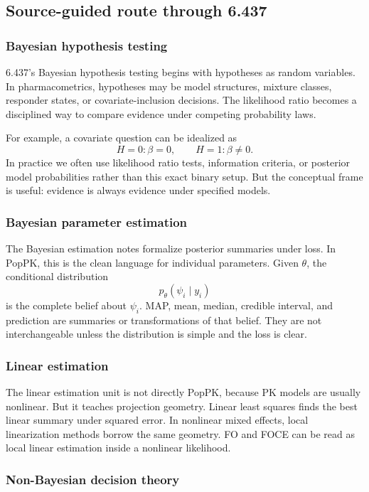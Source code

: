 \subsection{Source-guided route through 6.437}

\subsubsection*{Bayesian hypothesis testing}

6.437's Bayesian hypothesis testing begins with hypotheses as random variables.  In pharmacometrics, hypotheses may be model structures, mixture classes, responder states, or covariate-inclusion decisions.  The likelihood ratio becomes a disciplined way to compare evidence under competing probability laws.

For example, a covariate question can be idealized as
\[
  H=0:\beta=0,
  \qquad
  H=1:\beta\neq 0.
\]
In practice we often use likelihood ratio tests, information criteria, or posterior model probabilities rather than this exact binary setup.  But the conceptual frame is useful: evidence is always evidence under specified models.

\subsubsection*{Bayesian parameter estimation}

The Bayesian estimation notes formalize posterior summaries under loss.  In PopPK, this is the clean language for individual parameters.  Given \(\theta\), the conditional distribution
\[
  p_\theta(\psi_i\mid y_i)
\]
is the complete belief about \(\psi_i\).  MAP, mean, median, credible interval, and prediction are summaries or transformations of that belief.  They are not interchangeable unless the distribution is simple and the loss is clear.

\subsubsection*{Linear estimation}

The linear estimation unit is not directly PopPK, because PK models are usually nonlinear.  But it teaches projection geometry.  Linear least squares finds the best linear summary under squared error.  In nonlinear mixed effects, local linearization methods borrow the same geometry.  FO and FOCE can be read as local linear estimation inside a nonlinear likelihood.

\subsubsection*{Non-Bayesian decision theory}

